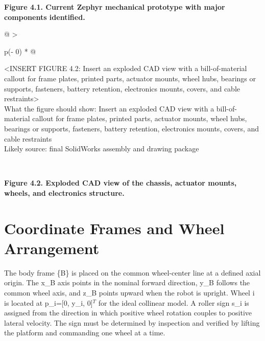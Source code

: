 \begin{center}\singlespacing
{}
\textbf{Figure 4.1. Current Zephyr mechanical prototype with major components identified.}
\end{center}

\begin{longtable}[]{@{}
  >{\raggedright\arraybackslash}p{(\columnwidth - 0\tabcolsep) * }@{}}
\toprule\noalign{}
\begin{minipage}[b]{\linewidth}\raggedright
\textless INSERT FIGURE 4.2: Insert an exploded CAD view with a
bill-of-material callout for frame plates, printed parts, actuator
mounts, wheel hubs, bearings or supports, fasteners, battery retention,
electronics mounts, covers, and cable restraints\textgreater{}\\
What the figure should show: Insert an exploded CAD view with a
bill-of-material callout for frame plates, printed parts, actuator
mounts, wheel hubs, bearings or supports, fasteners, battery retention,
electronics mounts, covers, and cable restraints\\
Likely source: final SolidWorks assembly and drawing package\strut
\end{minipage} \\
\midrule\noalign{}
\endhead
\bottomrule\noalign{}
\endlastfoot
\end{longtable}

\begin{center}\singlespacing
{}
\textbf{Figure 4.2. Exploded CAD view of the chassis, actuator mounts, wheels, and electronics structure.}
\end{center}

\section{Coordinate Frames and Wheel Arrangement}\label{coordinate-frames-and-wheel-arrangement}

The body frame \{B\} is placed on the common wheel-center line at a
defined axial origin. The x\_B axis points in the nominal forward
direction, y\_B follows the common wheel axis, and z\_B points upward
when the robot is upright. Wheel i is located at p\_i=[0, y\_i, 0]\ensuremath{^{T}}
for the ideal collinear model. A roller sign s\_i is assigned from the
direction in which positive wheel rotation couples to positive lateral
velocity. The sign must be determined by inspection and verified by
lifting the platform and commanding one wheel at a time.

